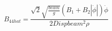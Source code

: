 \begin{equation} \label{eq:B44_hat_equation_quadratic}
B_{44 hat} = \frac{\sqrt{2} \sqrt{\frac{beam}{g}} \left(B_{1} + B_{2} \left|{\dot{\phi}}\right|\right) \dot{\phi}}{2 Disp beam^{2} \rho}
\end{equation}
